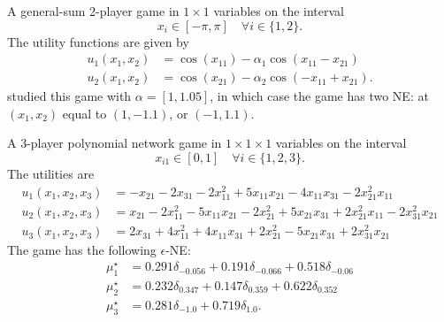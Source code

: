 \begin{game}\label{ex.ratliff13.location}
A general-sum 2-player game in $1 \times 1$ variables on the interval
\[
x_i \in [-\pi, \pi] \quad \forall i \in \{1,2\}.
\]
The utility functions are given by
\begin{align*}
u_{1}\left( x_{1}, x_{2} \right) &= \cos\left( x_{11} \right) - \alpha_1 \cos\left( x_{11} - x_{21} \right) \\
u_{2}\left( x_{1}, x_{2} \right) &= \cos\left( x_{21} \right) - \alpha_2 \cos\left(  - x_{11} + x_{21} \right).
\end{align*}
\textcite[Location Game]{ratliff.burden.ea:characterization} studied this game with $\alpha = [1, 1.05]$, in which case the game has two NE: at $(x_1, x_2)$ equal to $(1,-1.1)$, or $(-1,1.1)$.
\end{game}

\begin{game}\label{ex.kroupa21.5}
A 3-player polynomial network game in $1 \times 1 \times 1$ variables on the interval
$$x_{i1} \in [0,1] \quad \forall i \in \{1,2,3\}.$$
The utilities \cite[Example~5]{kroupa21separablenetworkgames} are
\begin{align*}
u_{1}\left( x_{1}, x_{2}, x_{3} \right) &=  - x_{21} - 2 x_{31} - 2 x_{11}^{2} + 5 x_{11} x_{21} - 4 x_{11} x_{31} - 2 x_{21}^{2} x_{11} \\
u_{2}\left( x_{1}, x_{2}, x_{3} \right) &= x_{21} - 2 x_{11}^{2} - 5 x_{11} x_{21} - 2 x_{21}^{2} + 5 x_{21} x_{31} + 2 x_{21}^{2} x_{11} - 2 x_{31}^{2} x_{21} \\
u_{3}\left( x_{1}, x_{2}, x_{3} \right) &= 2 x_{31} + 4 x_{11}^{2} + 4 x_{11} x_{31} + 2 x_{21}^{2} - 5 x_{21} x_{31} + 2 x_{31}^{2} x_{21}
\end{align*}
The game has the following $\epsilon$-NE:
\begin{align*}
\mu_1^\star &= 0.291\delta_{-0.056} + 0.191\delta_{-0.066} + 0.518\delta_{-0.06} \\
\mu_2^\star &= 0.232\delta_{0.347} + 0.147\delta_{0.359} + 0.622\delta_{0.352} \\
\mu_3^\star &= 0.281\delta_{-1.0} + 0.719\delta_{1.0}.
\end{align*}
\end{game}

